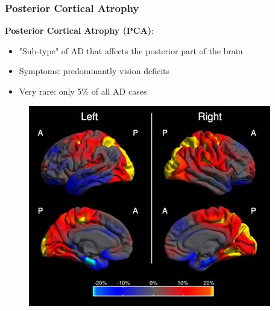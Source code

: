 \documentclass[10pt,xcolor=table]{beamer}
\begin{document}
\begin{frame}
\frametitle{Posterior Cortical Atrophy}

\textbf{Posterior Cortical Atrophy (PCA)}:
\begin{itemize}
 \item "Sub-type" of AD that affects the posterior part of the brain
 \item Symptoms: predominantly vision deficits
 \item Very rare: only 5\% of all AD cases 
\end{itemize}

\vspace{1em}
\begin{figure}
\centering 
\includegraphics[scale=0.5]{PCAimageStory.jpg}
\end{figure}


\end{frame}
\end{document}
